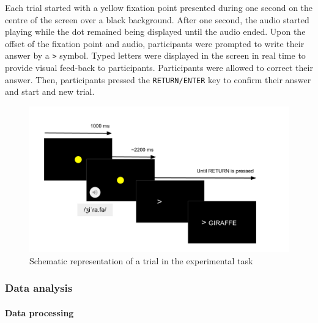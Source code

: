 \documentclass[
]{article}
\let\oldparagraph\paragraph
\renewcommand{\paragraph}[1]{\oldparagraph{#1}\mbox{}}
\begin{document}
Each trial started with a yellow fixation point presented during one
second on the centre of the screen over a black background. After one
second, the audio started playing while the dot remained being displayed
until the audio ended. Upon the offset of the fixation point and audio,
participants were prompted to write their answer by a
\texttt{\textgreater{}} symbol. Typed letters were displayed in the
screen in real time to provide visual feed-back to participants.
Participants were allowed to correct their answer. Then, participants
pressed the \texttt{RETURN/ENTER} key to confirm their answer and start
and new trial.

\begin{figure}[H]

{\centering \includegraphics{_assets/img/design.png}

}

\caption{Schematic representation of a trial in the experimental task}

\end{figure}%

\subsubsection{Data analysis}\label{data-analysis}

\paragraph{Data processing}\label{data-processing}
\end{document}
